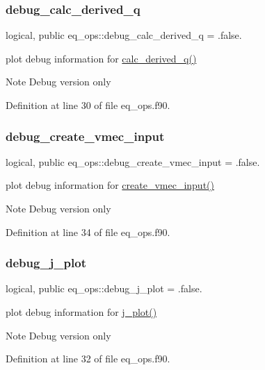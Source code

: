 \subsubsection{\texorpdfstring{debug\+\_\+calc\+\_\+derived\+\_\+q}{debug\_calc\_derived\_q}}
{\footnotesize\ttfamily logical, public eq\+\_\+ops\+::debug\+\_\+calc\+\_\+derived\+\_\+q = .false.}



plot debug information for \hyperlink{namespaceeq__ops_a087e08ce6d8ad381b5bac8fc51148d50}{calc\+\_\+derived\+\_\+q()} 

\begin{DoxyNote}{Note}
Debug version only 
\end{DoxyNote}


Definition at line 30 of file eq\+\_\+ops.\+f90.

\mbox{\label{namespaceeq__ops_a07ca60790a262e20bc8632be1530970a}} 
\subsubsection{\texorpdfstring{debug\+\_\+create\+\_\+vmec\+\_\+input}{debug\_create\_vmec\_input}}
{\footnotesize\ttfamily logical, public eq\+\_\+ops\+::debug\+\_\+create\+\_\+vmec\+\_\+input = .false.}



plot debug information for \hyperlink{namespaceeq__ops_a9addef683b3d4a8c587510e4c994ec61}{create\+\_\+vmec\+\_\+input()} 

\begin{DoxyNote}{Note}
Debug version only 
\end{DoxyNote}


Definition at line 34 of file eq\+\_\+ops.\+f90.

\mbox{\label{namespaceeq__ops_a45ba7f46fd439bbd73edfd1fd548b58e}} 
\subsubsection{\texorpdfstring{debug\+\_\+j\+\_\+plot}{debug\_j\_plot}}
{\footnotesize\ttfamily logical, public eq\+\_\+ops\+::debug\+\_\+j\+\_\+plot = .false.}



plot debug information for \hyperlink{namespaceeq__ops_afabdf28e5c26ceb87e6eb8cf3809919d}{j\+\_\+plot()} 

\begin{DoxyNote}{Note}
Debug version only 
\end{DoxyNote}


Definition at line 32 of file eq\+\_\+ops.\+f90.

